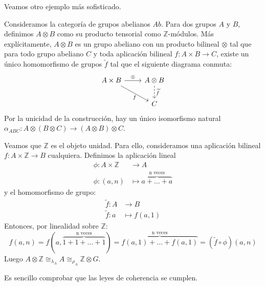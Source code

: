 \documentclass[12pt, twoside]{book}
\newcommand{\Ab}{{Ab}}
\newcommand{\Z}{{\mathbb{Z}}}
\begin{document}
Veamos otro ejemplo más sofisticado.
\begin{example}
\label{ej-abeliano}
Consideramos la categoría de grupos abelianos $\Ab$.
Para dos grupos $A$ y $B$, definimos $A \otimes B$ como su producto tensorial como $\Z$-módulos.
Más explícitamente, $A \otimes B$ es un grupo abeliano con un producto bilineal $\otimes$ tal que para todo grupo abeliano $C$ y toda aplicación bilineal $f \colon A \times B \to C$, existe un único homomorfismo de grupos $\widetilde{f}$ tal que el siguiente diagrama conmuta:
\[ \begin{tikzcd}{A \times B} \arrow[dr,"f" below] \arrow[r,"\otimes"] & {A \otimes B}\arrow[d,"\widetilde{f}",dashed]\\
& C \end{tikzcd}\]
Por la unicidad de la construcción, hay un único isomorfismo natural $\alpha_{ABC} \colon A \otimes (B \otimes C) \to (A \otimes B) \otimes C$.

Veamos que $\Z$ es el objeto unidad.
Para ello, consideramos una aplicación bilineal $f \colon A \times \Z \to B$ cualquiera.
Definimos la aplicación lineal
\begin{align*}
\phi \colon A \times \Z & \to A\\
\phi \colon (a,n) & \mapsto \overbrace{a + \dots + a}^\text{n veces}
\end{align*}
y el homomorfismo de grupo:
\begin{align*}
\widetilde{f} \colon A & \to B\\
\widetilde{f} \colon a & \mapsto f(a,1)
\end{align*}
Entonces, por linealidad sobre $\Z$:
\[ f(a,n) = f(a,\overbrace{1 + 1 + \dots + 1}^\text{n veces}) = \overbrace{f(a,1) + \dots + f(a,1)}^\text{n veces} = (\widetilde{f} \circ \phi)(a,n)\]
Luego $A \otimes \Z \cong_{\lambda_A} A \cong_{\rho_A} \Z \otimes G$.

Es sencillo comprobar que las leyes de coherencia se cumplen.
\end{example}
\end{document}

